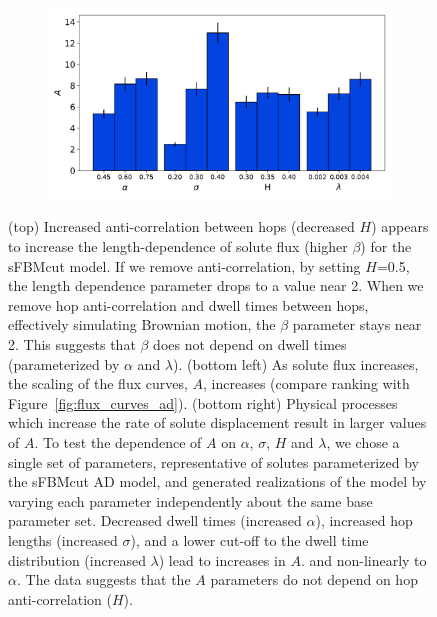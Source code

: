\documentclass[aps,pre,preprint,groupedaddress]{revtex4-2}
\begin{document}
\begin{figure}
\begin{subfigure}{0.66\textwidth}
  \includegraphics[width=\textwidth]{c_influence.pdf}
  \caption*{}\label{fig:c_influence}
  \end{subfigure}
  \vspace{-1.5cm}
  \caption{(top) Increased anti-correlation between hops (decreased $H$) appears to 
  increase the length-dependence of solute flux (higher $\beta$) for the sFBMcut model.
  If we remove anti-correlation, by setting $H$=0.5, the length dependence parameter
  drops to a value near 2. When we remove hop anti-correlation and dwell times between
  hops, effectively simulating Brownian motion, the $\beta$ parameter stays near 2. 
  This suggests that $\beta$ does not depend on dwell times (parameterized by $\alpha$
  and $\lambda$). (bottom left) As solute flux increases, the scaling of the flux 
  curves, $A$, increases (compare ranking with Figure~\ref{fig:flux_curves_ad}).
  (bottom right) Physical processes which increase the rate of solute displacement 
  result in larger values of $A$. To test the dependence of $A$ on $\alpha$, $\sigma$, 
  $H$ and $\lambda$, we chose a single set of parameters, representative of solutes
  parameterized by the sFBMcut AD model, and generated realizations of the
  model by varying each parameter independently about the same base parameter set. 
  Decreased dwell times (increased $\alpha$), increased hop lengths (increased 
  $\sigma$), and a lower cut-off to the dwell time distribution (increased $\lambda$)
  lead to increases in $A$. 
  and non-linearly to $\alpha$.
  The data suggests that the $A$ parameters do not depend on hop anti-correlation ($H$).
  }\label{fig:beta}
  \end{figure}
    
\end{document}
